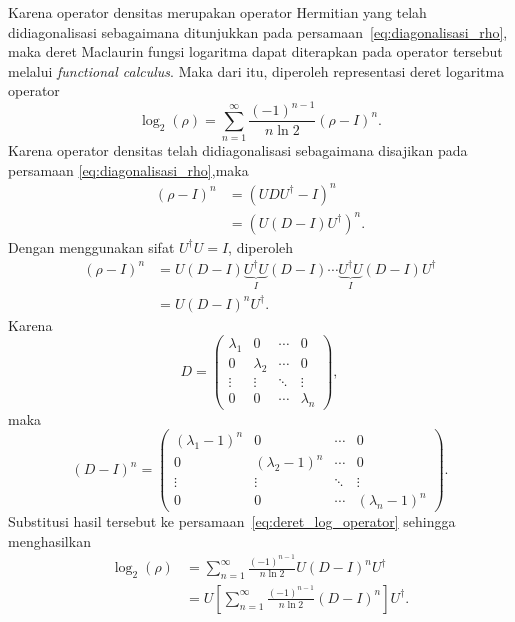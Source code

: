Karena operator densitas merupakan operator Hermitian yang telah didiagonalisasi sebagaimana ditunjukkan pada persamaan~\eqref{eq:diagonalisasi_rho}, maka deret Maclaurin fungsi logaritma dapat diterapkan pada operator tersebut melalui \textit{functional calculus}. Maka dari itu, diperoleh representasi deret logaritma operator
\begin{equation}
\label{eq:deret_log_operator}
    \log_2(\rho)
    =
    \sum_{n=1}^{\infty}
    \frac{(-1)^{n-1}}
         {n\ln2}
    (\rho-I)^n.
\end{equation}
Karena operator densitas telah didiagonalisasi sebagaimana disajikan pada persamaan \eqref{eq:diagonalisasi_rho},maka
\begin{equation}
\begin{split}
(\rho-I)^n
&=
(UDU^\dagger-I)^n
\\
&=
\left(
U(D-I)U^\dagger
\right)^n.
\end{split}
\end{equation}
Dengan menggunakan sifat $U^\dagger U=I$, diperoleh
\begin{equation}
\begin{split}
(\rho-I)^n
&=
U(D-I)
\underbrace{U^\dagger U}_{I}
(D-I)
\cdots
\underbrace{U^\dagger U}_{I}
(D-I)
U^\dagger
\\
&=
U(D-I)^nU^\dagger.
\end{split}
\end{equation}
Karena
\begin{equation}
D=
\begin{pmatrix}
\lambda_1&0&\cdots&0\\
0&\lambda_2&\cdots&0\\
\vdots&\vdots&\ddots&\vdots\\
0&0&\cdots&\lambda_n
\end{pmatrix},
\end{equation}
maka
\begin{equation}
(D-I)^n=
\begin{pmatrix}
(\lambda_1-1)^n&0&\cdots&0\\
0&(\lambda_2-1)^n&\cdots&0\\
\vdots&\vdots&\ddots&\vdots\\
0&0&\cdots&(\lambda_n-1)^n
\end{pmatrix}.
\end{equation}
Substitusi hasil tersebut ke persamaan~\eqref{eq:deret_log_operator} sehingga menghasilkan
\begin{equation}
\begin{split}
\log_2(\rho)
&=
\sum_{n=1}^{\infty}
\frac{(-1)^{n-1}}
{n\ln2}
U(D-I)^nU^\dagger
\\
&=
U
\left[
\sum_{n=1}^{\infty}
\frac{(-1)^{n-1}}
{n\ln2}
(D-I)^n
\right]
U^\dagger.
\end{split}
\end{equation}
